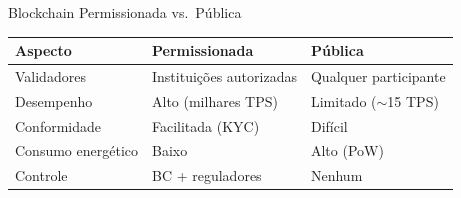 \documentclass{libs/ufc_format}
\begin{document}
\begin{frame}{Blockchain Permissionada vs.\ Pública}
    \begin{table}
        \centering
        \small
        \begin{tabular}{p{3cm}p{3.5cm}p{3.5cm}}
            \toprule
            \textbf{Aspecto} & \textbf{Permissionada} & \textbf{Pública} \\
            \midrule
            Validadores & Instituições autorizadas & Qualquer participante \\
            Desempenho & Alto (milhares TPS) & Limitado ($\sim$15 TPS) \\
            Conformidade & Facilitada (KYC) & Difícil \\
            Consumo energético & Baixo & Alto (PoW) \\
            Controle & BC + reguladores & Nenhum \\
            \bottomrule
        \end{tabular}
    \end{table}

    \vspace{0.3cm}

\end{frame}

\end{document}
